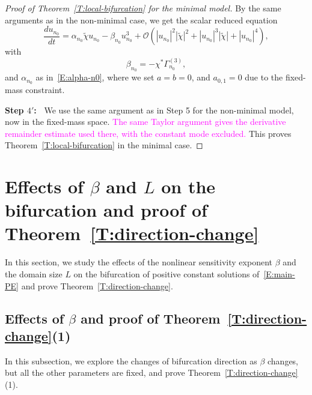 \documentclass[11pt]{article} %
\theoremstyle{remark}
\theoremstyle{remark}
\numberwithin{equation}{section}
\numberwithin{figure}{section}
\numberwithin{table}{section}
\begin{document}
\begin{proof}[Proof of Theorem~\ref{T:local-bifurcation} for the minimal model]
  \smallskip

  By the same arguments as in the non-minimal case, we get the scalar reduced
  equation
  \begin{equation}\label{E:center-ODE-initial-minimal}
    \frac{du_{n_0}}{dt}
    =\alpha_{n_0}\widetilde{\chi} u_{n_0}
    -\beta_{n_0}u_{n_0}^3
    +\mathcal{O}\left(
    |u_{n_0}|^2|\widetilde{\chi}|^2+|u_{n_0}|^3|\widetilde{\chi}|+|u_{n_0}|^4
    \right),
  \end{equation}
  with
  \begin{equation}\label{E:beta-n0-minimal}
    \beta_{n_0}=-\chi^*\Gamma_{n_0}^{(3)},
  \end{equation}
  and $\alpha_{n_0}$ as in~\eqref{E:alpha-n0}, where we set $a = b = 0$, and
  $a_{0,1} = 0$ due to the fixed-mass constraint.

  \smallskip

  \noindent\textbf{Step $4'$:~} We use the same argument as in Step 5 for the
  non-minimal model, now in the fixed-mass space.
  \textcolor{magenta}{The same Taylor argument gives the derivative remainder estimate used there, with the constant mode excluded.}
  This proves Theorem~\ref{T:local-bifurcation} in the minimal case.
\end{proof}


\section{Effects of $\beta$ and $L$ on the bifurcation and proof of Theorem~\ref{T:direction-change}}
\label{S:direction-change}

In this section, we study the effects of the nonlinear sensitivity exponent
$\beta$ and the domain size $L$ on the bifurcation of positive constant
solutions of~\eqref{E:main-PE} and prove Theorem~\ref{T:direction-change}.

\subsection{Effects of $\beta$  and proof of Theorem~\ref{T:direction-change}(1)}
\label{SS:beta-analysis}

In this subsection, we explore the changes of bifurcation direction as $\beta$
changes, but all the other parameters are fixed, and prove
Theorem~\ref{T:direction-change}(1).
\end{document}
